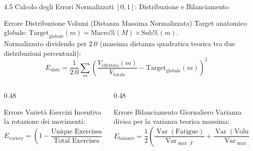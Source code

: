 \documentclass[aspectratio=169, 10pt]{beamer}
\begin{document}
\begin{frame}{4.5 Calcolo degli Errori Normalizzati $[0, 1]$: Distribuzione e Bilanciamento}
    \begin{block}{Errore Distribuzione Volumi (Distanza Massima Normalizzata)}
        \footnotesize
        Target anatomico globale: $\mathrm{Target}_{\mathrm{globale}}(m) = \mathrm{Macro\%}(M) \times \mathrm{Sub\%}(m)$. \\
        Normalizzato dividendo per $2.0$ (massima distanza quadratica teorica tra due distribuzioni percentuali):
        $$E_{\mathrm{distr}} = \frac{1}{2.0} \sum_{m} \left( \frac{V_{\mathrm{effettivo}}(m)}{V_{\mathrm{totale}}} - \mathrm{Target}_{\mathrm{globale}}(m) \right)^2$$
    \end{block}
    \vspace{-0.1cm}
    \begin{columns}[T]
        \begin{column}{0.48\textwidth}
            \begin{exampleblock}{Errore Varietà Esercizi}
                \footnotesize
                Incentiva la rotazione dei movimenti:
                $$E_{\mathrm{variety}} = \left( 1 - \frac{\text{Unique Exercises}}{\text{Total Exercises}} \right)^2$$
            \end{exampleblock}
        \end{column}
        \begin{column}{0.48\textwidth}
            \begin{exampleblock}{Errore Bilanciamento Giornaliero}
                \footnotesize
                Varianza divisa per la varianza teorica massima:
                $$E_{\mathrm{balance}} = \frac{1}{2} \left( \frac{\operatorname{Var}(\text{Fatigue})}{\operatorname{Var}_{\max\_F}} + \frac{\operatorname{Var}(\text{Volume})}{\operatorname{Var}_{\max\_V}} \right)$$
            \end{exampleblock}
        \end{column}
    \end{columns}
\end{frame}
\end{document}
